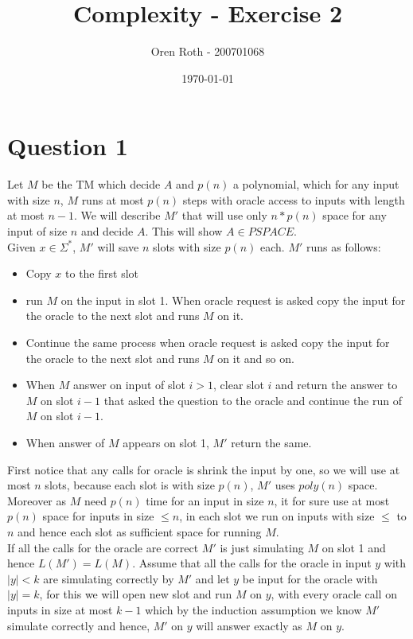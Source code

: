 \documentclass[11pt]{article}
\title{Complexity - Exercise 2}
\author{Oren Roth - 200701068}
\date{\today}
\theoremstyle{plain}
\theoremstyle{nonumberplainnobrackets}
\begin{document}
\maketitle
\section*{Question 1}
 Let $M$ be the TM which decide $A$ and $p(n)$ a polynomial, which for any input with size $n$, $M$ runs at most $p(n)$ steps with oracle access to inputs with length at most $n-1$.
 We will describe $M'$ that will use only $n*p(n)$ space for any input of size $n$ and decide $A$. This will show $A\in PSPACE$.\\
Given $x\in \Sigma^*$, $M'$ will save $n$ slots with size $p(n)$ each. $M'$ runs as follows:

\begin{itemize}
	\item Copy $x$ to the first slot
	\item run $M$ on the input in slot 1. When oracle request is asked copy the input for the oracle to the next slot and runs $M$ on it. 
	\item Continue the same process when oracle request is asked copy the input for the oracle to the next slot and runs $M$ on it and so on. 
	\item When $M$ answer on input of slot $i>1$, clear slot $i$ and return the answer to $M$ on slot $i-1$ that asked the question to the oracle and continue the run of $M$ on slot $i-1$.
	\item When answer of $M$ appears on slot 1, $M'$ return the same.
\end{itemize}
First notice that any calls for oracle is shrink the input by one, so we will use at most $n$ slots, because each slot is with size $p(n)$, $M'$ uses $poly(n)$ space. Moreover as $M$ need $p(n)$ time for an input in size $n$, it for sure use at most $p(n)$ space for inputs in size $\le n$, in each slot we run on inputs with size $\le$ to $n$ and hence each slot as sufficient space for running $M$.\\  
If all the calls for the oracle are correct $M'$ is just simulating $M$ on slot 1 and hence $L(M')=L(M)$. 
Assume that all the calls for the oracle in input $y$ with $|y|<k$ are simulating correctly by $M'$ and let $y$ be input for the oracle with $|y|=k$, for this we will open new slot and run $M$ on $y$, with every oracle call on inputs in size at most $k-1$ which by the induction assumption we know $M'$ simulate correctly and hence, $M'$ on $y$ will answer exactly as $M$ on $y$.
\end{document}
